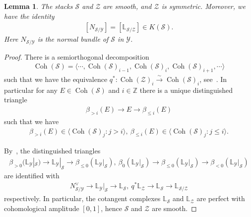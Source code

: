 \documentclass [11pt,oneside,a4paper,mathscr]{amsart}
\newtheorem{lemma}[thm]{Lemma}
\theoremstyle{definition}
\renewcommand{\leq}{\leqslant}
\newcommand{\Coh}{\operatorname{Coh}}
\begin{document}
\begin{lemma}\label{em:sym}
	The stacks $\mathcal{S}$ and $\mathcal{Z}$ are smooth, and 
	$\mathcal{Z}$ is symmetric. Moreover, we have the identity
	\begin{align}\label{sym:N}
		[N_{\mathcal{S}/\mathcal{Y}}]=[\mathbb{L}_{\mathcal{S}/\mathcal{Z}}] \in K(\mathcal{S}). 
		\end{align}
        Here $N_{\mathcal{S}/\mathcal{Y}}$ is the normal bundle of $\mathcal{S}$ in $\mathcal{Y}$. 
	\end{lemma}
\begin{proof}
	There is a semiorthogonal decomposition 
	\begin{align}\label{sod:S}
		\Coh(\mathcal{S})=\langle \cdots, \Coh(\mathcal{S})_{i-1}, \Coh(\mathcal{S})_{i}, \Coh(\mathcal{S})_{i+1}, \cdots \rangle
		\end{align}
	such that we have the equivalence 
    $q^{\ast} \colon \Coh(\mathcal{Z})_i \stackrel{\sim}{\to} \Coh(\mathcal{S})_i$, see~\cite[Proposition~1.1.2, Lemma~1.5.6]{HalpK32}. 
	In particular for any $E \in \Coh(\mathcal{S})$ and $i\in \mathbb{Z}$ there is a unique 
	distinguished triangle 
	\begin{align}\label{triangle:beta}
		\beta_{>i}(E) \to E \to \beta_{\leq i}(E)
		\end{align}
	such that we have 
    \begin{align*}\beta_{>i}(E) \in \langle \Coh(\mathcal{S})_j : j>i\rangle, \ 
	\beta_{\leq i}(E) \in \langle \Coh(\mathcal{S})_j : j\leq i\rangle.
    \end{align*}
    
		By~\cite[Lemma~1.3.2, Lemma~1.5.5]{HalpK32}, the distinguished triangles 
	\begin{align*}
		\beta_{>0}(\mathbb{L}_{\mathcal{Y}}|_{\mathcal{S}}) \to 
		\mathbb{L}_{\mathcal{Y}}|_{\mathcal{S}} \to \beta_{\leq 0}(\mathbb{L}_{\mathcal{Y}}|_{\mathcal{S}}), \ 
		\beta_0(\mathbb{L}_{\mathcal{Y}}|_{\mathcal{S}}) \to 
		\beta_{\leq 0}(\mathbb{L}_{\mathcal{Y}}|_{\mathcal{S}}) \to \beta_{<0}(\mathbb{L}_{\mathcal{Y}}|_{\mathcal{S}})
		\end{align*}
	are identified with 
	\begin{align}\label{tri:NL}
		N_{\mathcal{S}/\mathcal{Y}}^{\vee} \to \mathbb{L}_{\mathcal{Y}}|_{\mathcal{S}} \to \mathbb{L}_{\mathcal{S}}, \ 
		q^{\ast}\mathbb{L}_{\mathcal{Z}} \to \mathbb{L}_{\mathcal{S}} \to \mathbb{L}_{\mathcal{S}/\mathcal{Z}}
		\end{align}
	respectively. 
    In particular, the cotangent complexes $\mathbb{L}_{\mathcal{S}}$ and $\mathbb{L}_{\mathcal{Z}}$ 
    are perfect with cohomological amplitude $[0, 1]$, hence $\mathcal{S}$ and $\mathcal{Z}$ 
    are smooth. 
    

\end{proof}
\end{document}

